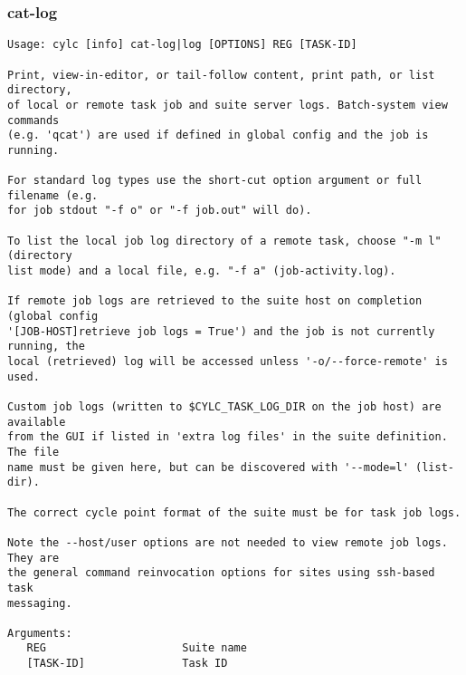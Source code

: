 \subsubsection{cat-log}
\label{cat-log}
\begin{lstlisting}
Usage: cylc [info] cat-log|log [OPTIONS] REG [TASK-ID] 

Print, view-in-editor, or tail-follow content, print path, or list directory,
of local or remote task job and suite server logs. Batch-system view commands
(e.g. 'qcat') are used if defined in global config and the job is running.

For standard log types use the short-cut option argument or full filename (e.g.
for job stdout "-f o" or "-f job.out" will do).

To list the local job log directory of a remote task, choose "-m l" (directory
list mode) and a local file, e.g. "-f a" (job-activity.log).

If remote job logs are retrieved to the suite host on completion (global config
'[JOB-HOST]retrieve job logs = True') and the job is not currently running, the
local (retrieved) log will be accessed unless '-o/--force-remote' is used.

Custom job logs (written to $CYLC_TASK_LOG_DIR on the job host) are available
from the GUI if listed in 'extra log files' in the suite definition. The file
name must be given here, but can be discovered with '--mode=l' (list-dir).

The correct cycle point format of the suite must be for task job logs.

Note the --host/user options are not needed to view remote job logs. They are
the general command reinvocation options for sites using ssh-based task
messaging.

Arguments:
   REG                     Suite name
   [TASK-ID]               Task ID


\end{lstlisting}
